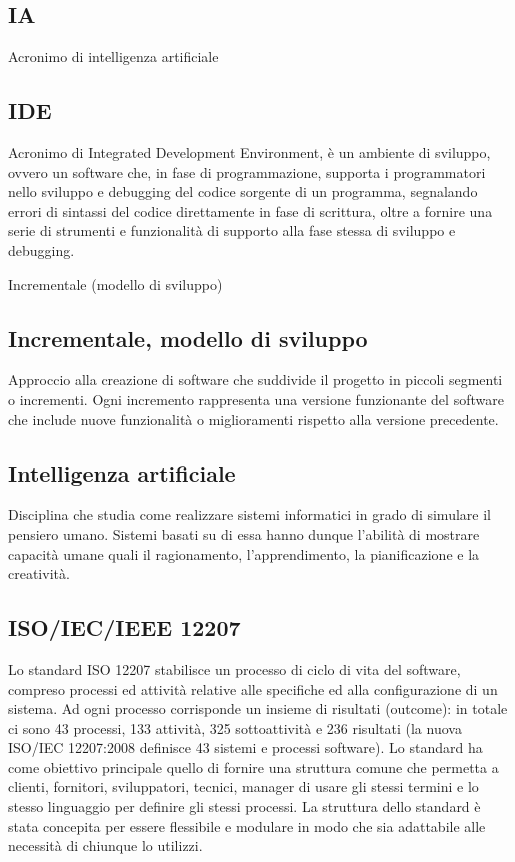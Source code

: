 \hypertarget{sec:ia}{}
\subsection*{IA}
Acronimo di intelligenza artificiale

\hypertarget{sec:ide}{}
\subsection*{IDE}
Acronimo di Integrated Development Environment, è un ambiente di sviluppo, ovvero un software che, in fase di programmazione, supporta i programmatori 
nello sviluppo e debugging del codice sorgente di un programma, segnalando errori di sintassi del codice direttamente in fase di scrittura, oltre a fornire 
una serie di strumenti e funzionalità di supporto alla fase stessa di sviluppo e debugging.

\hypertarget{sec:modello_incrementale}{Incrementale (modello di sviluppo)}
\subsection*{Incrementale, modello di sviluppo}
Approccio alla creazione di software che suddivide il progetto in piccoli segmenti o incrementi. 
Ogni incremento rappresenta una versione funzionante del software che include nuove funzionalità o miglioramenti rispetto alla versione precedente.

\hypertarget{sec:intelligenza_artificiale}{}
\subsection*{Intelligenza artificiale}
Disciplina che studia come realizzare sistemi informatici in grado di simulare il pensiero umano. Sistemi basati su di essa hanno dunque l'abilità di mostrare 
capacità umane quali il ragionamento, l'apprendimento, la pianificazione e la creatività.

\hypertarget{ISO/IEC/IEEE 12207}{}
\subsection*{ISO/IEC/IEEE 12207}
Lo standard ISO 12207 stabilisce un processo di ciclo di vita del software, compreso processi ed attività relative alle specifiche ed alla configurazione di un sistema.
Ad ogni processo corrisponde un insieme di risultati (outcome): in totale ci sono 43 processi, 133 attività, 325 sottoattività e 236 risultati (la nuova ISO/IEC 12207:2008 definisce 43 sistemi e processi software).
Lo standard ha come obiettivo principale quello di fornire una struttura comune che permetta a clienti, fornitori, sviluppatori, tecnici, manager di usare gli stessi termini e lo stesso linguaggio per definire gli stessi processi.
La struttura dello standard è stata concepita per essere flessibile e modulare in modo che sia adattabile alle necessità di chiunque lo utilizzi.

